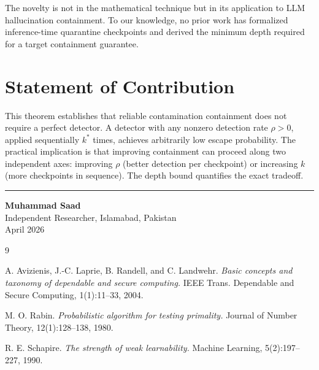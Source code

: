 \documentclass[12pt,a4paper]{article}
\begin{document}
The novelty is not in the mathematical technique but in its application to LLM hallucination containment. To our knowledge, no prior work has formalized inference-time quarantine checkpoints and derived the minimum depth required for a target containment guarantee.

\section{Statement of Contribution}

This theorem establishes that reliable contamination containment does not require a perfect detector. A detector with any nonzero detection rate $\rho > 0$, applied sequentially $k^*$ times, achieves arbitrarily low escape probability. The practical implication is that improving containment can proceed along two independent axes: improving $\rho$ (better detection per checkpoint) or increasing $k$ (more checkpoints in sequence). The depth bound quantifies the exact tradeoff.

\vspace{1cm}
\noindent\rule{\textwidth}{0.4pt}
\vspace{0.3cm}

\noindent \textbf{Muhammad Saad} \\
Independent Researcher, Islamabad, Pakistan \\
April 2026

\begin{thebibliography}{9}

A. Avizienis, J.-C. Laprie, B. Randell, and C. Landwehr.
\textit{Basic concepts and taxonomy of dependable and secure computing.}
IEEE Trans. Dependable and Secure Computing, 1(1):11--33, 2004.

M. O. Rabin.
\textit{Probabilistic algorithm for testing primality.}
Journal of Number Theory, 12(1):128--138, 1980.

R. E. Schapire.
\textit{The strength of weak learnability.}
Machine Learning, 5(2):197--227, 1990.

\end{thebibliography}
\end{document}
